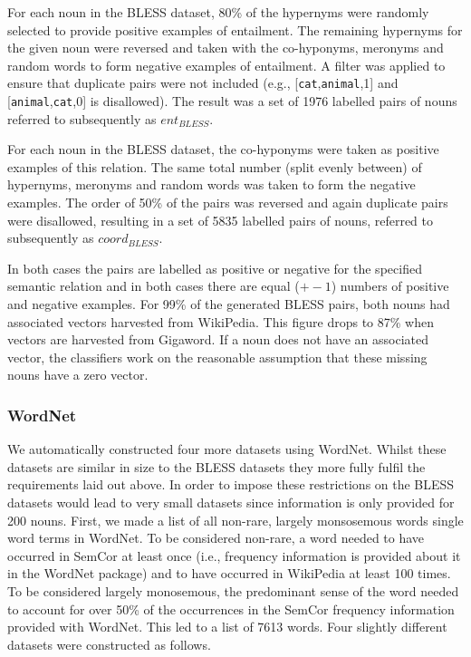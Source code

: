 \documentclass[11pt]{article}
\begin{document}
For each noun in the BLESS dataset, 80\% of the hypernyms were randomly selected to provide positive examples of entailment.  The remaining hypernyms for the given noun were reversed and taken with the co-hyponyms, meronyms and random words to form negative examples of entailment.  A filter was applied to ensure that duplicate pairs were not included (e.g., [\texttt{cat},\texttt{animal},1] and [\texttt{animal},\texttt{cat},0] is disallowed). The result was a set of 1976 labelled pairs of nouns referred to subsequently as $ent_{BLESS}$.

For each noun in the BLESS dataset, the co-hyponyms were taken as positive examples of this relation.  The same total number (split evenly between) of hypernyms, meronyms and random words was taken to form the negative examples.  The order of 50\% of the pairs was reversed and again duplicate pairs were disallowed, resulting in a set of 5835 labelled pairs of nouns, referred to subsequently as $coord_{BLESS}$.

In both cases the pairs are labelled as positive or negative for the specified semantic relation and in both cases there are equal ($+-1$) numbers of positive and negative examples.  For 99\% of the generated BLESS pairs, both nouns had associated vectors harvested from WikiPedia.   This figure drops to 87\% when vectors are harvested from Gigaword. If a noun does not have an associated vector, the classifiers work on the reasonable assumption that these missing nouns have a zero vector.  

\subsubsection{WordNet}

We automatically constructed four more datasets using WordNet.  Whilst these datasets are similar in size to the BLESS datasets they more fully fulfil the requirements laid out above.  In order to impose these restrictions on the BLESS datasets would lead to very small datasets since information is only provided for 200 nouns.  First, we made a list of all non-rare, largely monsosemous words single word terms in WordNet.  To be considered non-rare, a word needed to have occurred in SemCor at least once (i.e., frequency information is provided about it in the WordNet package) and to have occurred in WikiPedia at least 100 times.  To be considered largely monosemous, the predominant sense of the word needed to account for over 50\% of the occurrences in the SemCor frequency information provided with WordNet.  This led to a list of 7613 words.  Four slightly different datasets were constructed as follows.
\end{document}

